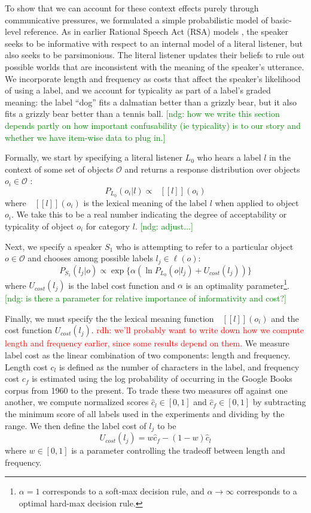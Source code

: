 \documentclass[10pt,letterpaper]{article}
\newcommand{\red}[1]{\textcolor{Red}{#1}}
\newcommand{\ndg}[1]{\textcolor{Green}{[ndg: #1]}}
\newcommand{\denote}[1]{\mbox{ $[\![ #1 ]\!]$}}
\begin{document}
To show that we can account for these context effects purely through communicative pressures, we formulated a simple probabilistic model of basic-level reference. As in earlier Rational Speech Act (RSA) models \cite{frank2012, goodmanstuhlmueller2013}, the speaker seeks to be informative with respect to an internal model of a literal listener, but also seeks to be parsimonious. The literal listener updates their beliefs to rule out possible worlds that are inconsistent with the meaning of the speaker's utterance. We incorporate length and frequency as costs that affect the speaker's likelihood of using a label, and we account for typicality as part of a label's graded meaning: the label ``dog'' fits a dalmatian better than a grizzly bear, but it also fits a grizzly bear better than a tennis ball.
\ndg{how we write this section depends partly on how important confusability (ie typicality) is to our story and whether we have item-wise data to plug in.}

Formally, we start by specifying a literal listener $L_0$ who hears a label $l$ in the context of some set of objects $\mathcal{O}$ and returns a response distribution over objects $o_i \in \mathcal{O}$ : 
$$P_{L_0}(o_i | l) \propto \denote{l}(o_i)$$
where $\denote{l}(o_i)$ is the lexical meaning of the label $l$ when applied to object $o_i$. We take this to be a real number indicating the degree of acceptability or typicality of object $o_i$ for category $l$. \ndg{adjust...}

Next, we specify a speaker $S_1$ who is attempting to refer to a particular object $o \in \mathcal{O}$ and chooses among possible labels $l_j \in \ell(o)$: 
$$P_{S_1}(l_j | o) \propto \exp\{\alpha \left( \ln P_{L_0}(o | l_j) + U_{cost}(l_j) \right) \}$$
where $U_{cost}(l_j)$ is the label cost function and $\alpha$ is an optimality parameter\footnote{$\alpha = 1$ corresponds to a soft-max decision rule, and $\alpha \rightarrow \infty$ corresponds to a optimal hard-max decision rule.}. \ndg{is there a parameter for relative importance of informativity and cost?}

Finally, we must specify the the lexical meaning function $\denote{l}(o_i)$ and the cost function $U_{cost}(l_j)$. 
\red{rdh: we'll probably want to write down how we compute length and frequency earlier, since some results depend on them.}
We measure label cost as the linear combination of two components: length and frequency. Length cost $c_l$ is defined as the number of characters in the label, and frequency cost $c_f$ is estimated using the log probability of occurring in the Google Books corpus from 1960 to the present. To trade these two measures off against one another, we compute normalized scores $\hat{c}_l \in [0,1]$ and $\hat{c}_f \in [0,1]$ by subtracting the minimum score of all labels used in the experiments and dividing by the range. We then define the label cost of $l_j$ to be $$U_{cost}(l_j) = w\hat{c}_f - (1-w)\hat{c}_l$$ where $w \in [0,1]$ is a parameter controlling the tradeoff between length and frequency.
\end{document}

